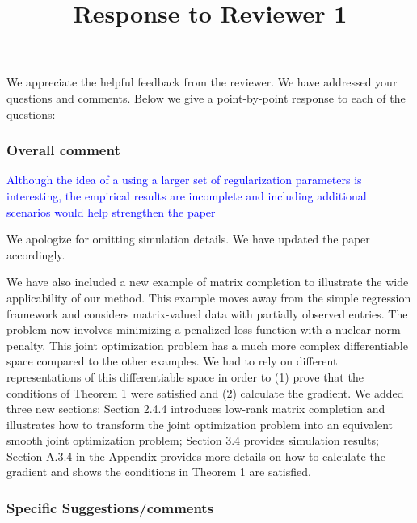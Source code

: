 \documentclass[]{article}
\title{Response to Reviewer 1}
\newcommand{\overall}[1]{\textcolor{blue}{#1}}
\begin{document}
	
	\maketitle
	
	We appreciate the helpful feedback from the reviewer. We have addressed your questions and comments. Below we give a point-by-point response to each of the questions:
	
	\subsubsection*{Overall comment}
	\overall{Although the idea of a using a larger set of regularization parameters is interesting, the empirical results are incomplete and including additional scenarios would help strengthen the paper}
	
	We apologize for omitting simulation details. We have updated the paper accordingly.
	
	We have also included a new example of matrix completion to illustrate the wide applicability of our method. This example moves away from the simple regression framework and considers matrix-valued data with partially observed entries. The problem now involves minimizing a penalized loss function with a nuclear norm penalty. This joint optimization problem has a much more complex differentiable space compared to the other examples. We had to rely on different representations of this differentiable space in order to (1) prove that the conditions of Theorem 1 were satisfied and (2) calculate the gradient. We added three new sections: Section 2.4.4 introduces low-rank matrix completion and illustrates how to transform the joint optimization problem into an equivalent smooth joint optimization problem; Section 3.4 provides simulation results; Section A.3.4 in the Appendix provides more details on how to calculate the gradient and shows the conditions in Theorem 1 are satisfied.
		
	\subsubsection*{Specific Suggestions/comments}
	
\end{document}
